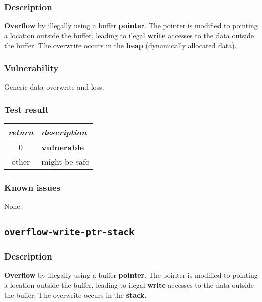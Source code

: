 \documentclass[a4paper]{book}
\begin{document}
\subsubsection{Description}

\textbf{Overflow} by illegally using a buffer \textbf{pointer}.
The pointer is modified to pointing a location outside the buffer,
leading to ilegal \textbf{write} accesses to the data outside the buffer.
The overwrite occurs in the \textbf{heap} (dynamically allocated data).

\subsubsection{Vulnerability}
Generic data overwrite and loss.

\subsubsection{Test result}

\begin{tabular}{cl}
  \toprule
  \emph{return}  & \emph{description} \\
  \midrule
  0              & \textbf{vulnerable} \\
  other          & might be safe \\
  \bottomrule
\end{tabular}

\subsubsection{Known issues}

None.

\newpage

\subsection{\texttt{overflow-write-ptr-stack}}\label{test-overflow-write-ptr-stack}

\subsubsection{Description}

\textbf{Overflow} by illegally using a buffer \textbf{pointer}.
The pointer is modified to pointing a location outside the buffer,
leading to ilegal \textbf{write} accesses to the data outside the buffer.
The overwrite occurs in the \textbf{stack}.
\end{document}
